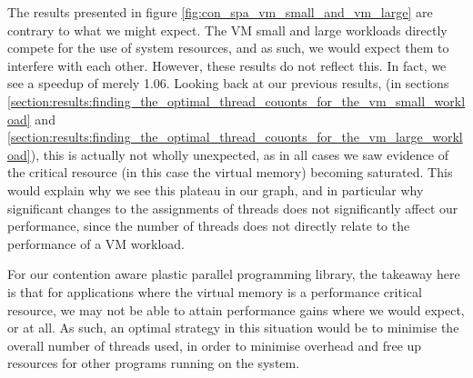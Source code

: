 The results presented in figure \ref{fig:con_spa_vm_small_and_vm_large} are contrary to what we might expect. The VM small and large workloads directly compete for the use of system resources, and as such, we would expect them to interfere with each other. However, these results do not reflect this. In fact, we see a speedup of merely 1.06. Looking back at our previous results, (in sections \ref{section:results:finding_the_optimal_thread_couonts_for_the_vm_small_workload} and \ref{section:results:finding_the_optimal_thread_couonts_for_the_vm_large_workload}), this is actually not wholly unexpected, as in all cases we saw evidence of the critical resource (in this case the virtual memory) becoming saturated. This would explain why we see this plateau in our graph, and in particular why significant changes to the assignments of threads does not significantly affect our performance, since the number of threads does not directly relate to the performance of a VM workload.

For our contention aware plastic parallel programming library, the takeaway here is that for applications where the virtual memory is a performance critical resource, we may not be able to attain performance gains where we would expect, or at all. As such, an optimal strategy in this situation would be to minimise the overall number of threads used, in order to minimise overhead and free up resources for other programs running on the system.



